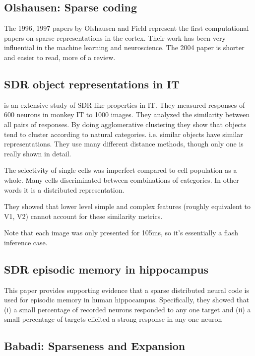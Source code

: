 \documentclass{article} %
\begin{document}
\subsection{Olshausen: Sparse coding}

The 1996, 1997 papers \cite{Olshausen1996, Olshausen1997} by Olshausen and Field
represent the first computational papers on sparse representations in the
cortex. Their work has been very influential in the machine learning and
neuroscience. The 2004 paper \cite{Olshausen2004} is shorter and easier to read,
more of a review.

\subsection{SDR object representations in IT}

\cite{Kiani2007} is an extensive study of SDR-like properties in IT. They
measured responses of 600 neurons in monkey IT to 1000 images. They analyzed the
similarity between all pairs of responses. By doing agglomerative clustering
they show that objects tend to cluster according to natural categories. i.e.
similar objects have similar representations. They use many different distance
methods, though only one is really shown in detail.

The selectivity of single cells was imperfect compared to cell population as a
whole. Many cells discriminated between combinations of categories. In other
words it is a distributed representation.

They showed that lower level simple and complex features (roughly equivalent to
V1, V2) cannot account for these similarity metrics.

Note that each image was only presented for 105ms, so it's essentially a flash
inference case.

\subsection{SDR episodic memory in hippocampus} This paper \cite{Wixted2014}
provides supporting evidence that a sparse distributed neural code  is used for
episodic memory in human hippocampus. Specifically, they showed that  (i) a
small  percentage of recorded neurons responded to any one target and (ii) a
small percentage of targets  elicited a strong response in any one neuron

\subsection{Babadi: Sparseness and Expansion}
\end{document}
